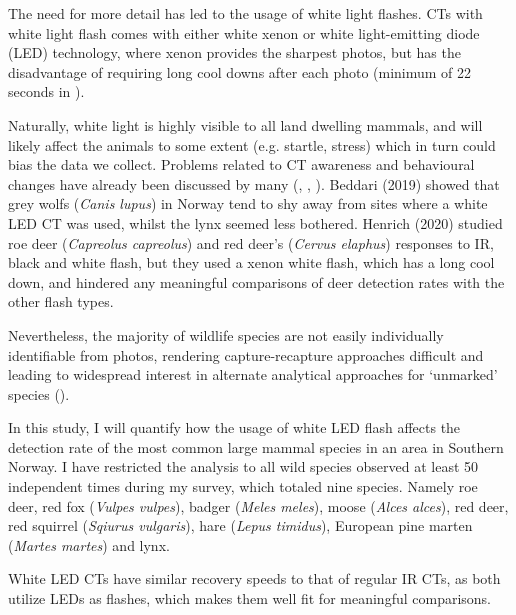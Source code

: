 The need for more detail has led to the usage of white light flashes.
CTs with white light flash comes with either white xenon or white light-emitting diode (LED) technology, where xenon provides the sharpest photos, but has the disadvantage of requiring long cool downs after each photo (minimum of 22 seconds %
in \cite{Henrich2020}).

Naturally, white light is highly visible to all land dwelling mammals, and will likely affect the animals to some extent (e.g. startle, stress) which in turn could bias the data we collect. Problems related to CT awareness and behavioural changes have already been discussed by many (\cite{Meek2014}, \cite{Burton2015}, \cite{Hofmeester2019}). %
Beddari (2019) showed that grey wolfs (\textit{Canis lupus}) in Norway tend to shy away from sites where a white LED CT was used, whilst the  lynx  seemed less bothered. %
Henrich (2020) studied roe deer (\textit{Capreolus capreolus}) and red deer's (\textit{Cervus elaphus}) responses to IR, black and white flash, but they used a xenon white flash, which has a long cool down, and hindered any meaningful comparisons of deer detection rates with the other flash types.

%
Nevertheless, the majority of wildlife species are not easily individually identifiable from photos, rendering capture-recapture approaches difficult and leading to widespread interest in alternate analytical approaches for ‘unmarked’ species (\cite{Burton2015}). %



In this study, I will quantify how the usage of white LED flash affects the detection rate of the most common large mammal species in an area in Southern Norway.
I have restricted the analysis to all wild species observed at least 50 independent times during my survey, which totaled nine species.
Namely roe deer, red fox (\textit{Vulpes vulpes}), badger (\textit{Meles meles}), moose (\textit{Alces alces}), red deer, red squirrel (\textit{Sqiurus vulgaris}), hare (\textit{Lepus timidus}), European pine marten (\textit{Martes martes}) and lynx. 

White LED CTs have similar recovery speeds to that of regular IR CTs, as both utilize LEDs as flashes, which makes them well fit for meaningful comparisons.

